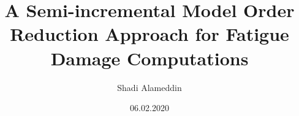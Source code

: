 \documentclass[twoside,a5paper,openright,9pt]{extbook}
\title{A Semi-incremental Model Order Reduction Approach for Fatigue Damage Computations}
\author{Shadi Alameddin}
\date{06.02.2020}
\begin{document}
\thispagestyle{empty}

\cleardoublepage
\begin{sloppypar}
	
	\cleardoublepage
	
\end{sloppypar}
\end{document}
